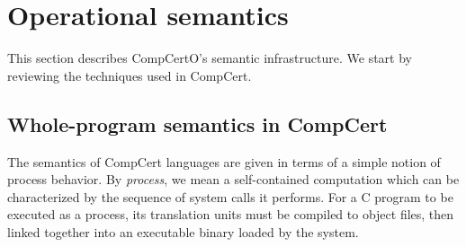 \documentclass[sigplan,screen]{acmart}
\newenvironment{optional}{}{}
\begin{document}


\section{Operational semantics} \label{sec:sem} %

This section describes CompCertO's semantic infrastructure.
We start by reviewing the techniques used in CompCert.

\subsection{Whole-program semantics in CompCert} \label{sec:sem:closed} %


The semantics of CompCert languages
are given in terms of a simple notion of process behavior.
By \emph{process}, we mean a self-contained computation
which can be characterized by
the sequence of system calls it performs.
For a C program to be executed as a process,
its translation units must be compiled to object files,
then linked together
into an executable binary
loaded by the system.

%
%
\end{document}
